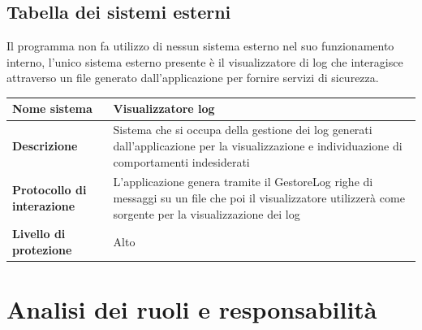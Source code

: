 \documentclass[12pt,a4paper]{report}
\begin{document}
\subsection{Tabella dei sistemi esterni}
Il programma non fa utilizzo di nessun sistema esterno nel suo funzionamento interno, l'unico sistema esterno presente è il visualizzatore di log che interagisce attraverso un file generato dall'applicazione per fornire servizi di sicurezza.

\begin{tabularx}{\textwidth}{|X|X|}
    \hline
    \endhead
    \rowcolor{studyColor} \textbf{Nome sistema} & Visualizzatore log \\ \hline
    \textbf{Descrizione} & Sistema che si occupa della gestione dei log generati dall'applicazione per la visualizzazione e individuazione di comportamenti indesiderati \\ \hline
    \textbf{Protocollo di interazione} & L'applicazione genera tramite il GestoreLog righe di messaggi su un file che poi il visualizzatore utilizzerà come sorgente per la visualizzazione dei log \\ \hline
    \textbf{Livello di protezione} & Alto \\ \hline
\end{tabularx}

\newpage
\section{Analisi dei ruoli e responsabilità}
\end{document}
